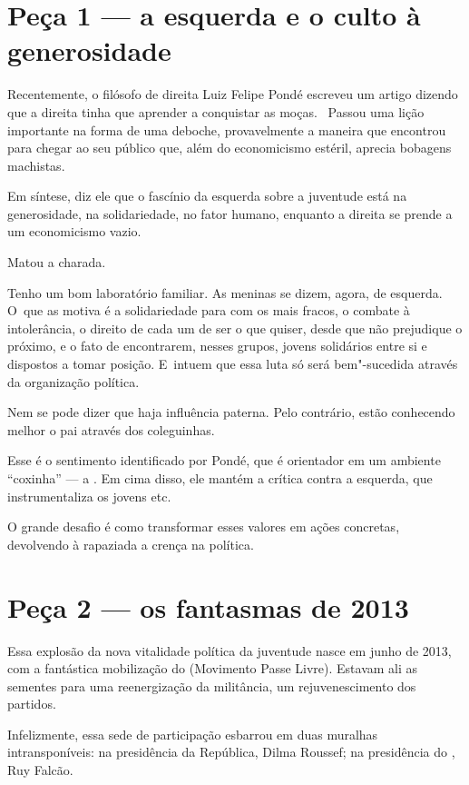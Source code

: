  

\section{Peça 1 --- a esquerda e o culto à generosidade}

Recentemente, o filósofo de direita Luiz Felipe Pondé escreveu um artigo
dizendo que a direita tinha que aprender a conquistar as moças.~ Passou
uma lição importante na forma de uma deboche, provavelmente a maneira
que encontrou para chegar ao seu público que, além do economicismo
estéril, aprecia bobagens machistas.

Em síntese, diz ele que o fascínio da esquerda sobre a juventude está na
generosidade, na solidariedade, no fator humano, enquanto a direita se
prende a um economicismo vazio.

Matou a charada.

Tenho um bom laboratório familiar. As meninas se dizem, agora, de
esquerda. O~que as motiva é a solidariedade para com os mais fracos, o
combate à intolerância, o direito de cada um de ser o que quiser, desde
que não prejudique o próximo, e o fato de encontrarem, nesses grupos,
jovens solidários entre si e dispostos a tomar posição. E~intuem que
essa luta só será bem"-sucedida através da organização política.

Nem se pode dizer que haja influência paterna. Pelo contrário, estão
conhecendo melhor o pai através dos coleguinhas.

Esse é o sentimento identificado por Pondé, que é orientador em um
ambiente ``coxinha'' --- a . Em cima disso, ele mantém a crítica
contra a esquerda, que instrumentaliza os jovens etc.

O grande desafio é como transformar esses valores em ações concretas,
devolvendo à rapaziada a crença na política.

\section{Peça 2 --- os fantasmas de 2013}

Essa explosão da nova vitalidade política da juventude nasce em junho de
2013, com a fantástica mobilização do  (Movimento Passe Livre).
Estavam ali as sementes para uma reenergização da militância, um
rejuvenescimento dos partidos.

Infelizmente, essa sede de participação esbarrou em duas muralhas
intransponíveis: na presidência da República, Dilma Roussef; na
presidência do , Ruy Falcão.

